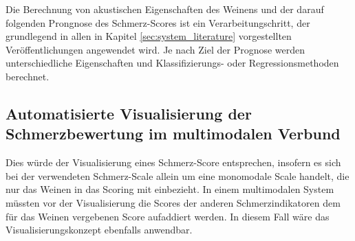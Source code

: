 Die Berechnung von akustischen Eigenschaften des Weinens und der darauf folgenden Prongnose des Schmerz-Scores ist ein Verarbeitungschritt, der grundlegend in allen in Kapitel \ref{sec:system_literature} vorgestellten Veröffentlichungen angewendet wird. Je nach Ziel der Prognose werden unterschiedliche Eigenschaften und Klassifizierungs- oder Regressionsmethoden berechnet. 


\subsection{Automatisierte Visualisierung der Schmerzbewertung im multimodalen Verbund}



Dies würde der Visualisierung eines Schmerz-Score entsprechen, insofern es sich bei der verwendeten Schmerz-Scale allein um eine monomodale Scale handelt, die nur das Weinen in das Scoring mit einbezieht. In einem multimodalen System müssten vor der Visualisierung die Scores der anderen Schmerzindikatoren dem für das Weinen vergebenen Score aufaddiert werden. In diesem Fall wäre das Visualisierungskonzept ebenfalls anwendbar.
